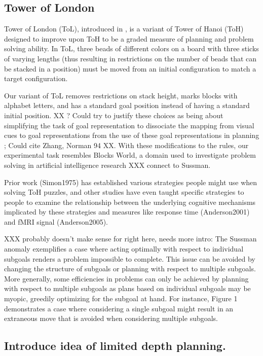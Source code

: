 \documentclass[10pt,letterpaper]{article}
\begin{document}
\subsection{Tower of London}

Tower of London (ToL), introduced in \cite{Shallice1982}, is a variant of Tower of Hanoi (ToH) designed to improve upon ToH to be a graded measure of planning and problem solving ability.  In ToL, three beads of different colors on a board with three sticks of varying lengths (thus resulting in restrictions on the number of beads that can be stacked in a position) must be moved from an initial configuration to match a target configuration.

Our variant of ToL removes restrictions on stack height, marks blocks with alphabet letters, and has a standard goal position instead of having a standard initial position. XX ? Could try to justify these choices as being about simplifying the task of goal representation to dissociate the mapping from visual cues to goal representations from the use of these goal representations in planning ; Could cite Zhang, Norman 94 XX. With these modifications to the rules, our experimental task resembles Blocks World, a domain used to investigate problem solving in artificial intelligence research XXX connect to Sussman.

Prior work (Simon1975) has established various strategies people might use when solving ToH puzzles, and other studies have even taught specific strategies to people to examine the relationship between the underlying cognitive mechanisms implicated by these strategies and measures like response time (Anderson2001) and fMRI signal (Anderson2005).

XXX probably doesn't make sense for right here, needs more intro: The Sussman anomaly exemplifies a case where acting optimally with respect to individual subgoals renders a problem impossible to complete. This issue can be avoided by changing the structure of subgoals or planning with respect to multiple subgoals. More generally, some efficiencies in problems can only be achieved by planning with respect to multiple subgoals as plans based on individual subgoals may be myopic, greedily optimizing for the subgoal at hand. For instance, Figure 1 demonstrates a case where considering a single subgoal might result in an extraneous move that is avoided when considering multiple subgoals.

\subsection{Introduce idea of limited depth planning.}
\end{document}
